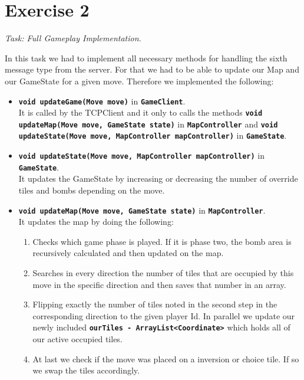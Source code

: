 \section*{Exercise 2}
\textit{Task: Full Gameplay Implementation.} 

\noindent In this task we had to implement all necessary methods for handling the sixth message type from the server. For that we had to be able to update our Map and our GameState for a given move. Therefore we implemented the following: 

\begin{itemize}
    \item \textbf{\texttt{void updateGame(Move move)}} in \textbf{\texttt{GameClient}}. \\
        It is called by the TCPClient and it only to calls the methods \textbf{\texttt{void updateMap(Move move, GameState state)}} in \textbf{\texttt{MapController}} and \textbf{\texttt{void updateState(Move move, MapController mapController)}} in \textbf{\texttt{GameState}}.
        
    \item \textbf{\texttt{void updateState(Move move, MapController mapController)}} in \textbf{\texttt{GameState}}. \\
        It updates the GameState by increasing or decreasing the number of override tiles and bombs depending on the move. 
        
    \item \textbf{\texttt{void updateMap(Move move, GameState state)}} in \textbf{\texttt{MapController}}. \\
        It updates the map by doing the following: \\
        \begin{enumerate}
            \item Checks which game phase is played. If it is phase two, the bomb area is recursively calculated and then updated on the map.
            \item Searches in every direction the number of tiles that are occupied by this move in the specific direction and then saves that number in an array.
            \item Flipping exactly the number of tiles noted in the second step in the corresponding direction to the given player Id. In parallel we update our newly included \textbf{\texttt{ourTiles - ArrayList<Coordinate>}} which holds all of our active occupied tiles.
            \item At last we check if the move was placed on a inversion or choice tile. If so we swap the tiles accordingly.
        \end{enumerate}
\end{itemize}

